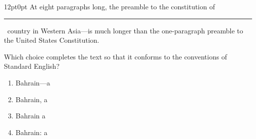\documentclass[11pt, twocolumn]{article}
\newcounter{questionnum}
\begin{document}
\vspace{6pt}\noindent
\begin{minipage}{\columnwidth}\raggedright
\noindent{}\par\vspace{8pt}
\begin{adjustwidth}{12pt}{0pt}
At eight paragraphs long, the preamble to the constitution of \,\rule{2cm}{0.4pt}\, country in Western Asia---is much longer than the one-paragraph preamble to the United States Constitution.
\vspace{6pt}

Which choice completes the text so that it conforms to the conventions of Standard English?
\begin{enumerate}[label=\Alph*),leftmargin=18pt,topsep=3pt,itemsep=2pt]
  \item Bahrain---a
  \item Bahrain, a
  \item Bahrain a
  \item Bahrain: a
\end{enumerate}
\end{adjustwidth}
\end{minipage}\par
\end{document}
